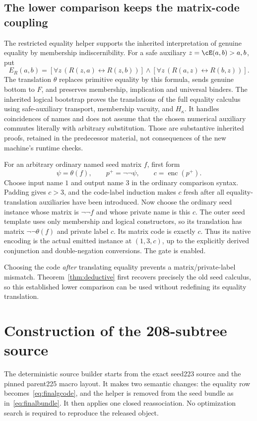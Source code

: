 \subsection{The lower comparison keeps the matrix-code coupling}

The restricted equality helper supports the inherited interpretation
of genuine equality by membership indiscernibility. For a safe
auxiliary $z=\cE(a,b)>a,b$, put
\[
 E_R(a,b)=
 [\forall z\,(R(z,a)\leftrightarrow R(z,b))]\land
 [\forall z\,(R(a,z)\leftrightarrow R(b,z))].
\]
The translation $\theta$ replaces primitive equality by this formula,
sends genuine bottom to $F$, and preserves membership, implication and
universal binders. The inherited logical bootstrap proves the
translations of the full equality calculus using safe-auxiliary
transport, membership vacuity, and $H_\kappa$. It handles coincidences
of names and does not assume that the chosen numerical auxiliary
commutes literally with arbitrary substitution. Those are substantive
inherited proofs, retained in the predecessor material, not consequences
of the new machine's runtime checks.

For an arbitrary ordinary named seed matrix $f$, first form
\[
 \psi=\theta(f),\qquad p^+=\neg\neg\psi,
 \qquad c=\operatorname{enc}(p^+).
\]
Choose input name $1$ and output name $3$ in the ordinary comparison
syntax. Padding gives $c>3$, and the code-label induction makes $c$
fresh after all equality-translation auxiliaries have been introduced.
Now choose the ordinary seed instance whose matrix is $\neg\neg f$
and whose private name is this $c$. The outer seed template uses only
membership and logical constructors, so its translation has matrix
$\neg\neg\theta(f)$ and private label $c$. Its matrix code is exactly
$c$. Thus its native encoding is the actual emitted instance at
$(1,3,c)$, up to the explicitly derived conjunction and double-negation
conversions. The gate is enabled.

Choosing the code \emph{after} translating equality prevents a
matrix/private-label mismatch. Theorem~\ref{thm:deductive} first
recovers precisely the old seed calculus, so this established lower
comparison can be used without redefining its equality translation.

\section{Construction of the 208-subtree source}
\label{sec:source}

The deterministic source builder starts from the exact seed223 source
and the pinned parent225 macro layout. It makes two semantic changes:
the equality row becomes~\eqref{eq:finalgcode}, and the helper is removed
from the seed bundle as in~\eqref{eq:finalbundle}. It then applies one
closed reassociation. No optimization search is required to reproduce
the released object.

